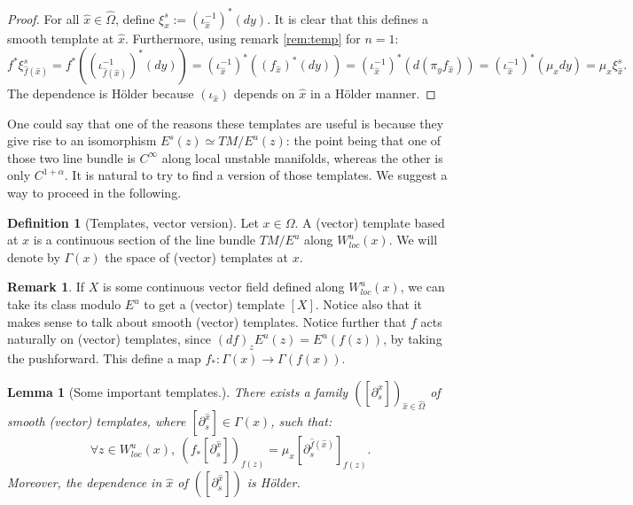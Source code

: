 \documentclass[a4paper]{article}
\newtheorem{lemma}[theorem]{Lemma}
\theoremstyle{definition}
\newtheorem{definition}{Definition}[section]
\newtheorem{remark}[example]{Remark}
\begin{document}
\begin{proof}
For all ${\widehat{x}} \in \widehat{\Omega}$, define $\xi_{\widehat{x}}^s := (\iota_{\widehat{x}}^{-1})^*(dy)$. It is clear that this defines a smooth template at ${\widehat{x}}$. Furthermore, using remark \ref{rem:temp} for $n=1$:
$$ f^* \xi_{\widehat{f}({\widehat{x}})}^s = f^* ((\iota_{\widehat{f}({\widehat{x}})}^{-1})^* (dy)) = (\iota_{{\widehat{x}}}^{-1})^* ((f_{\widehat{x}})^*(dy)) = (\iota_{{\widehat{x}}}^{-1})^* (d (\pi_y f_{\widehat{x}})) = (\iota_{{\widehat{x}}}^{-1})^* (\mu_x dy) = \mu_x \xi_{{\widehat{x}}}^s .$$
The dependence is Hölder because $(\iota_{\widehat{x}})$ depends on ${\widehat{x}}$ in a Hölder manner.
\end{proof}

One could say that one of the reasons these templates are useful is because they give rise to an isomorphism $E^s(z) \simeq TM/E^u(z)$: the point being that one of those two line bundle is $C^{\infty}$ along local unstable manifolds, whereas the other is only $C^{1+\alpha}$. It is natural to try to find a  version of those templates. We suggest a way to proceed in the following.

\begin{definition}[Templates, vector version]
Let $x \in \Omega$. A (vector) template based at $x$ is a continuous section of the line bundle $TM/E^u$ along $W^u_{loc}(x)$. We will denote by $\Gamma(x)$ the space of (vector) templates at $x$. 
\end{definition}

\begin{remark}
If $X$ is some continuous vector field defined along $W^u_{loc}(x)$, we can take its class modulo $E^u$ to get a (vector) template $[X]$. Notice also that it makes sense to talk about smooth (vector) templates. Notice further that $f$ acts naturally on (vector) templates, since $(df)_z E^u(z) = E^u(f(z))$, by taking the pushforward. This define a map $f_* : \Gamma(x) \rightarrow \Gamma(f(x))$.
\end{remark}

\begin{lemma}[Some important templates.]
There exists a family $([\partial_s^{\widehat{x}}])_{{\widehat{x}} \in \widehat{\Omega}}$ of smooth (vector) templates, where $[\partial_s^{\widehat{x}}] \in \Gamma(x)$, such that:
$$ \forall z \in W^u_{loc}(x), \ (f_*[\partial_s^{\widehat{x}}])_{f(z)} = \mu_x [\partial_s^{\widehat{f}({\widehat{x}})}]_{f(z)}.$$
Moreover, the dependence in ${\widehat{x}}$ of 
$([\partial_s^{\widehat{x}}])$ is Hölder.
\end{lemma}
\end{document}
